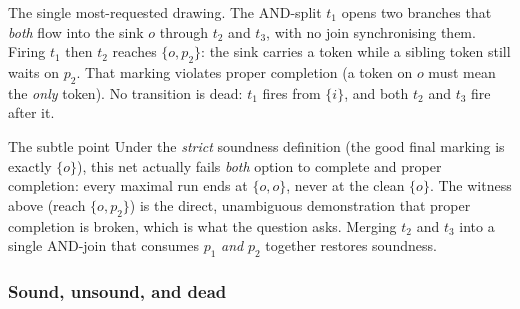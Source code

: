The single most-requested drawing. The AND-split $t_1$ opens two branches that \emph{both} flow into the sink $o$ through $t_2$ and $t_3$, with no join synchronising them. Firing $t_1$ then $t_2$ reaches $\{o, p_2\}$: the sink carries a token while a sibling token still waits on $p_2$. That marking violates proper completion (a token on $o$ must mean the \emph{only} token). No transition is dead: $t_1$ fires from $\{i\}$, and both $t_2$ and $t_3$ fire after it.
\begin{center}
\end{center}
\begin{notebox}{The subtle point}
Under the \emph{strict} soundness definition (the good final marking is exactly $\{o\}$), this net actually fails \emph{both} option to complete and proper completion: every maximal run ends at $\{o,o\}$, never at the clean $\{o\}$. The witness above (reach $\{o,p_2\}$) is the direct, unambiguous demonstration that proper completion is broken, which is what the question asks. Merging $t_2$ and $t_3$ into a single AND-join that consumes $p_1$ \emph{and} $p_2$ together restores soundness.
\end{notebox}

\subsubsection{Sound, unsound, and dead}

